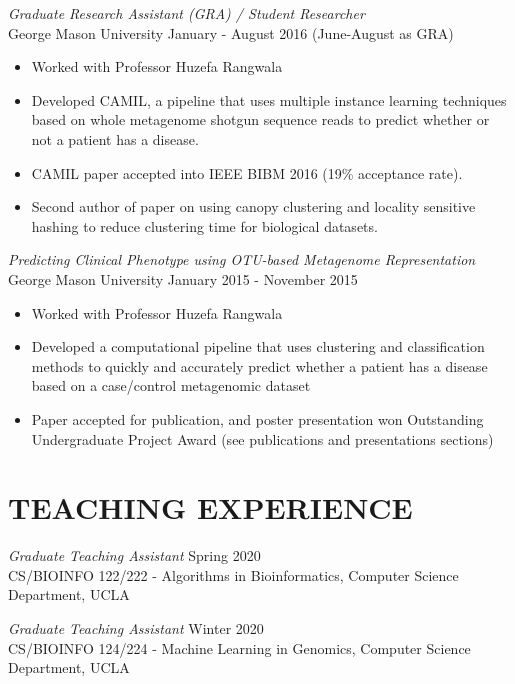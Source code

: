 \documentclass[margin, 10pt]{res} %
\begin{document}
\begin{resume}
{\sl Graduate Research Assistant (GRA) / Student Researcher} \\
George Mason University \hfill January - August 2016 (June-August as GRA)
\begin{itemize} \itemsep -2pt %
\item Worked with Professor Huzefa Rangwala 
\item Developed CAMIL, a pipeline that uses multiple instance learning techniques based on whole metagenome shotgun sequence reads to predict whether or not a patient has a disease.
\item CAMIL paper accepted into IEEE BIBM 2016 (19\% acceptance rate).
\item Second author of paper on using canopy clustering and locality sensitive hashing to reduce clustering time for biological datasets.
\end{itemize}

{\sl Predicting Clinical Phenotype using OTU-based Metagenome Representation} \\
George Mason University  \hfill January 2015 - November 2015
\begin{itemize} \itemsep -2pt %
\item Worked with Professor Huzefa Rangwala
\item Developed a computational pipeline that uses clustering and classification methods to quickly and accurately predict whether a patient has a disease based on a case/control metagenomic dataset
\item Paper accepted for publication, and poster presentation won Outstanding Undergraduate Project Award (see publications and presentations sections)
\end{itemize}


 
\section{TEACHING EXPERIENCE}

{\sl Graduate Teaching Assistant} \hfill Spring 2020 \\
CS/BIOINFO 122/222 - Algorithms in Bioinformatics, Computer Science Department, UCLA

{\sl Graduate Teaching Assistant} \hfill Winter 2020 \\
CS/BIOINFO 124/224 - Machine Learning in Genomics, Computer Science Department, UCLA


\end{resume}
\end{document}
